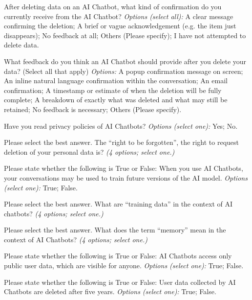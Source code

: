 {
\begin{description}[leftmargin=0pt,itemsep=1pt,font=\normalfont]
\item[\textbf{Q7.1}] After deleting data on an AI Chatbot, what kind of confirmation do you currently receive from the AI Chatbot? \emph{Options (select all):} A clear message confirming the deletion; A brief or vague acknowledgement (e.g. the item just disappears); No feedback at all; Others (Please specify); I have not attempted to delete data.
\item[\textbf{Q7.2}] What feedback do you think an AI Chatbot should provide after you delete your data? (Select all that apply) \emph{Options:} A popup confirmation message on screen; An inline natural language confirmation within the conversation; An email confirmation; A timestamp or estimate of when the deletion will be fully complete; A breakdown of exactly what was deleted and what may still be retained; No feedback is necessary; Others (Please specify).
\end{description}

\begin{description}[leftmargin=0pt,itemsep=1pt,font=\normalfont]
\item[\textbf{Q8.1}] Have you read privacy policies of AI Chatbots? \emph{Options (select one):} Yes; No.
\item[\textbf{Q8.2}] Please select the best answer. The ``right to be forgotten'', the right to request deletion of your personal data is? \emph{(4 options; select one.)}
\item[\textbf{Q8.3}] Please state whether the following is True or False: When you use AI Chatbots, your conversations may be used to train future versions of the AI model. \emph{Options (select one):} True; False.
\item[\textbf{Q8.4}] Please select the best answer. What are ``training data'' in the context of AI chatbots? \emph{(4 options; select one.)}
\item[\textbf{Q8.5}] Please select the best answer. What does the term ``memory'' mean in the context of AI Chatbots? \emph{(4 options; select one.)}
\item[\textbf{Q8.6}] Please state whether the following is True or False: AI Chatbots access only public user data, which are visible for anyone. \emph{Options (select one):} True; False.
\item[\textbf{Q8.7}] Please state whether the following is True or False: User data collected by AI Chatbots are deleted after five years. \emph{Options (select one):} True; False.
\end{description}

}
